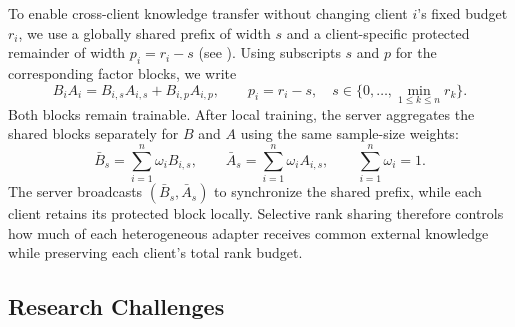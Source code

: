 To enable cross-client knowledge transfer without changing client $i$'s fixed budget $r_i$, we use a globally shared prefix of width $s$ and a client-specific protected remainder of width $p_i=r_i-s$ (see ).
Using subscripts $s$ and $p$ for the corresponding factor blocks, we write
\begin{equation}
    B_iA_i=B_{i,s}A_{i,s}+B_{i,p}A_{i,p},
    \qquad p_i=r_i-s,\quad s\in\{0,\ldots,\min_{1\le k\le n}r_k\}.
    \label{equ:selective-partition}
\end{equation}
Both blocks remain trainable.
After local training, the server aggregates the shared blocks separately for $B$ and $A$ using the same sample-size weights:
\begin{equation}
    \bar{B}_{s}=\sum_{i=1}^{n}\omega_i B_{i,s},
    \qquad
    \bar{A}_{s}=\sum_{i=1}^{n}\omega_i A_{i,s},
    \qquad
    \sum_{i=1}^{n}\omega_i=1.
    \label{equ:selective-aggregation}
\end{equation}
The server broadcasts $(\bar{B}_{s},\bar{A}_{s})$ to synchronize the shared prefix, while each client retains its protected block locally.
Selective rank sharing therefore controls how much of each heterogeneous adapter receives common external knowledge while preserving each client's total rank budget.





\subsection{Research Challenges}
\label{sec:problem:challenges}

